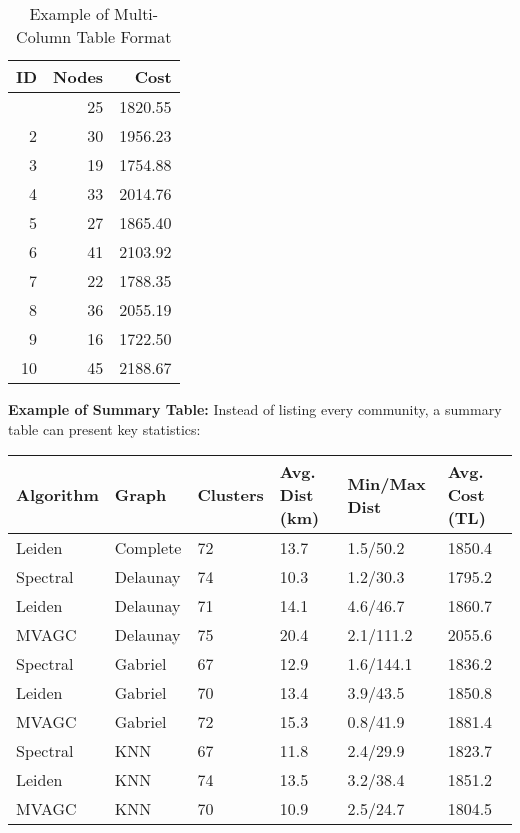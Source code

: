 \begin{appendix}
\begin{multicols}{2}
\begin{compacttable}
\begin{longtable}{@{}rrr@{}}
\caption{Example of Multi-Column Table Format}
\label{tab:example_multicol} \\
\toprule
\textbf{ID} & \textbf{Nodes} & \textbf{Cost} \\
\midrule
\endhead
\bottomrule
\endfoot
1 & 25 & 1820.55 \\
2 & 30 & 1956.23 \\
3 & 19 & 1754.88 \\
4 & 33 & 2014.76 \\
5 & 27 & 1865.40 \\
6 & 41 & 2103.92 \\
7 & 22 & 1788.35 \\
8 & 36 & 2055.19 \\
9 & 16 & 1722.50 \\
10 & 45 & 2188.67 \\
\end{longtable}
\end{compacttable}
\end{multicols}

\textbf{Example of Summary Table:} Instead of listing every community, a summary table can present key statistics:

\begin{compacttable}
\begin{tabularx}{\textwidth}{@{}lXXXXX@{}}
\toprule
\textbf{Algorithm} & \textbf{Graph} & \textbf{Clusters} & \textbf{Avg. Dist (km)} & \textbf{Min/Max Dist} & \textbf{Avg. Cost (TL)} \\
\midrule
Leiden & Complete & 72 & 13.7 & 1.5/50.2 & 1850.4 \\
Spectral & Delaunay & 74 & 10.3 & 1.2/30.3 & 1795.2 \\
Leiden & Delaunay & 71 & 14.1 & 4.6/46.7 & 1860.7 \\
MVAGC & Delaunay & 75 & 20.4 & 2.1/111.2 & 2055.6 \\
Spectral & Gabriel & 67 & 12.9 & 1.6/144.1 & 1836.2 \\
Leiden & Gabriel & 70 & 13.4 & 3.9/43.5 & 1850.8 \\
MVAGC & Gabriel & 72 & 15.3 & 0.8/41.9 & 1881.4 \\
Spectral & KNN & 67 & 11.8 & 2.4/29.9 & 1823.7 \\
Leiden & KNN & 74 & 13.5 & 3.2/38.4 & 1851.2 \\
MVAGC & KNN & 70 & 10.9 & 2.5/24.7 & 1804.5 \\
\bottomrule
\end{tabularx}
\end{compacttable}


\end{appendix}
